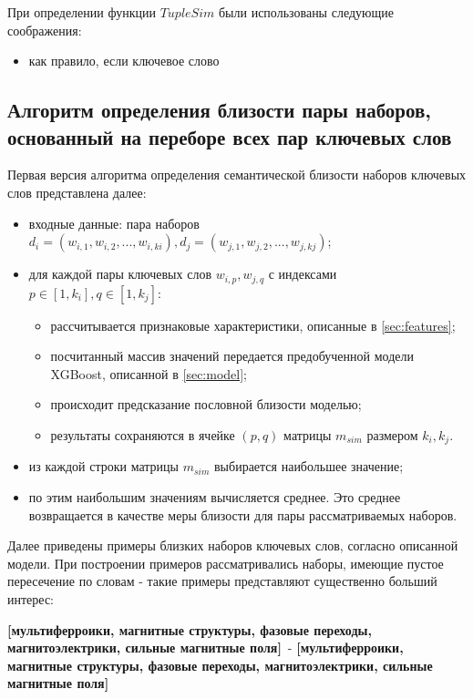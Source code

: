 При определении функции $TupleSim$ были использованы следующие соображения:
\begin{itemize}
    \item как правило, если ключевое слово
\end{itemize}


\subsection{Алгоритм определения близости пары наборов, основанный на переборе всех пар ключевых слов}
Первая версия алгоритма определения семантической близости наборов ключевых слов представлена далее:
\begin{itemize}
    \item входные данные: пара наборов $d_i = (w_{i,1},w_{i,2},...,w_{i,ki}), d_j = (w_{j,1},w_{j,2},...,w_{j,kj})$;
    \item для каждой пары ключевых слов $w_{i,p}, w_{j,q}$ с индексами $p \in [1, k_i], q \in [1, k_j]$:
        \begin{itemize}
            \item рассчитывается признаковые характеристики, описанные в \ref{sec:features};
            \item посчитанный массив значений передается предобученной модели XGBoost, описанной в \ref{sec:model};
            \item происходит предсказание пословной близости моделью;
            \item результаты сохраняются в ячейке $(p, q)$ матрицы $m_{sim}$ размером $k_i, k_j$.
        \end{itemize}
    \item из каждой строки матрицы $m_{sim}$ выбирается наибольшее значение;
    \item по этим наибольшим значениям вычисляется среднее. Это среднее возвращается в качестве меры близости для пары рассматриваемых наборов.
\end{itemize}

Далее приведены примеры близких наборов ключевых слов, согласно описанной модели. При построении примеров рассматривались наборы, имеющие пустое пересечение по словам - такие примеры представляют существенно больший интерес:

\textbf{[мультиферроики, магнитные структуры, фазовые переходы, магнитоэлектрики, сильные магнитные поля]}\
-
\textbf{[мультиферроики, магнитные структуры, фазовые переходы, магнитоэлектрики, сильные магнитные поля]}\

